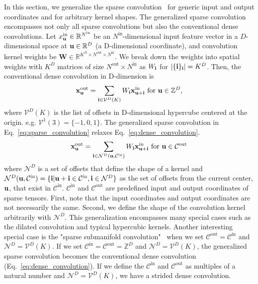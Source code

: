 In this section, we generalize the sparse convolution~\cite{sparsecnn, sparse3dcnn} for generic input and output coordinates and for arbitrary kernel shapes. The generalized sparse convolution encompasses not only all sparse convolutions but also the conventional dense convolutions. Let $x^{\text{in}}_{\mathbf{u}} \in \mathbb{R}^{N^\text{in}}$ be an $N^\text{in}$-dimensional input feature vector in a $D$-dimensional space at $\mathbf{u} \in \mathbb{R}^D$ (a D-dimensional coordinate), and convolution kernel weights be $\mathbf{W} \in \mathbb{R}^{K^D
\times N^\text{out} \times N^\text{in}}$. We break down the weights into spatial weights with $K^D$ matrices of size $N^\text{out} \times N^\text{in}$ as $W_{\mathbf{i}}$ for $|\{\mathbf{i}\}_{\mathbf{i}}| = K^D$. Then, the conventional dense convolution in D-dimension is
\begin{equation}
\mathbf{x}^{\text{out}}_{\mathbf{u}} = \sum_{\mathbf{i} \in \mathcal{V}^D(K)} W_{\mathbf{i}} \mathbf{x}^{\text{in}}_{\mathbf{u} + \mathbf{i}} \text{ for } \mathbf{u} \in \mathbb{Z}^D,
\label{eq:dense_convolution}
\end{equation}
where $\mathcal{V}^D(K)$ is the list of offsets in D-dimensional hypercube centered at the origin. e.g. $\mathcal{V}^1(3)=\{-1, 0, 1\}$. The generalized sparse convolution in Eq.~\ref{eq:sparse_convolution} relaxes Eq.~\ref{eq:dense_convolution}.
\begin{equation}
    \mathbf{x}^{\text{out}}_{\mathbf{u}} = \sum_{\mathbf{i} \in \mathcal{N}^D(\mathbf{u}, \mathcal{C}^{\text{in}})} W_{\mathbf{i}} \mathbf{x}^{\text{in}}_{\mathbf{u} + \mathbf{i}} \text{ for } \mathbf{u} \in \mathcal{C}^{\text{out}}
\label{eq:sparse_convolution}
\end{equation}
where $\mathcal{N}^D$ is a set of offsets that define the shape of a kernel and $\mathcal{N}^D(\mathbf{u}, \mathcal{C}^\text{in})= \{\mathbf{i} | \mathbf{u} + \mathbf{i} \in \mathcal{C}^\text{in}, \mathbf{i} \in \mathcal{N}^D \}$ as the set of offsets from the current center, $\mathbf{u}$, that exist in $\mathcal{C}^\text{in}$. $\mathcal{C}^\text{in}$ and $\mathcal{C}^\text{out}$ are predefined input and output coordinates of sparse tensors. First, note that the input coordinates and output coordinates are not necessarily the same. Second, we define the shape of the convolution kernel arbitrarily with $\mathcal{N}^D$. This generalization encompasses many special cases such as the dilated convolution and typical hypercubic kernels. Another interesting special case is the "sparse submanifold convolution"~\cite{sparse3dcnn} when we set $\mathcal{C}^\text{out} = \mathcal{C}^\text{in}$ and $\mathcal{N}^D = \mathcal{V}^D(K)$. If we set $\mathcal{C}^\text{in} = \mathcal{C}^\text{out} = \mathbb{Z}^D$ and $\mathcal{N}^D = \mathcal{V}^D(K)$, the generalized sparse convolution becomes the conventional dense convolution (Eq.~\ref{eq:dense_convolution}). If we define the $\mathcal{C}^\text{in}$ and $\mathcal{C}^\text{out}$ as multiples of a natural number and $\mathcal{N}^D = \mathcal{V}^D(K)$, we have a strided dense convolution.
